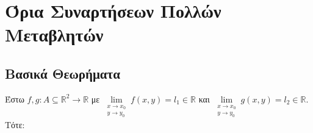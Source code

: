 \documentclass[a4paper,11pt]{report}
\begin{document}
\chapter{Όρια Συναρτήσεων Πολλών Μεταβλητών}


\section{Βασικά Θεωρήματα}

\begin{mybox2}
  \begin{thm}
    Έστω $ f,g \colon A \subseteq \mathbb{R}^{2} \to \mathbb{R} $ με 
    $ \lim\limits_{\substack{x\to x_{0} \\y \to y_{0}}}  f(x,y) = l_{1} \in \mathbb{R} $ 
    και 
    $ \lim\limits_{\substack{x\to x_{0} \\y \to y_{0}}} g(x,y) = l_{2} \in \mathbb{R} $. 
    Τότε:


\end{thm}
\end{mybox2}
\end{document}
